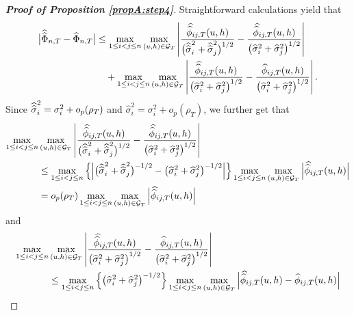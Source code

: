 \documentclass[12pt]{article}
\begin{document}
\begin{proof}[\textnormal{\textbf{Proof of Proposition \ref{propA:step4}}}] 
Straightforward calculations yield that
\begin{align*}
\begin{split}
\big| \doublehattwo{\Phi}_{n, T} - \widehat{\Phi}_{n, T} \big| &\le \max_{1 \le i < j \le n} \max_{(u,h) \in \mathcal{G}_T} \left|\frac{\doublehat{\phi}_{ij,T}(u,h)}{\big(\doublehattwo{\sigma}_i^2 + \doublehattwo{\sigma}_j^2\big)^{1/2}} - \frac{\doublehat{\phi}_{ij,T}(u,h)}{\big(\widehat{\sigma}_i^2 + \widehat{\sigma}_j^2\big)^{1/2}}\right| \\
&\quad+\max_{1 \le i < j \le n} \max_{(u,h) \in \mathcal{G}_T} \left|\frac{\doublehat{\phi}_{ij,T}(u,h)}{\big(\widehat{\sigma}_i^2 + \widehat{\sigma}_j^2\big)^{1/2}} - \frac{\widehat{\phi}_{ij,T}(u,h)} {\big( \widehat{\sigma}_i^2 + \widehat{\sigma}_j^2 \big)^{1/2}} \right|.
\end{split}
\end{align*}
Since $\widehat{\widehat{\sigma}}_i^2 = \sigma_i^2 + o_p(\rho_T)$ and $\widehat{\sigma}_i^2 = \sigma_i^2 + o_p(\rho_T)$, we further get that 
\begin{align*}
\max_{1 \le i < j \le n} &\max_{(u,h) \in \mathcal{G}_T} \left|\frac{\doublehat{\phi}_{ij,T}(u,h)}{\big(\doublehattwo{\sigma}_i^2 + \doublehattwo{\sigma}_j^2\big)^{1/2}} - \frac{\doublehat{\phi}_{ij,T}(u,h)}{\big(\widehat{\sigma}_i^2 + \widehat{\sigma}_j^2\big)^{1/2}}\right|  \\
&\le\max_{1 \le i < j \le n} \left\{ \Big|\big(\doublehattwo{\sigma}_i^2 + \doublehattwo{\sigma}_j^2 \big)^{-1/2} - \big(\widehat{\sigma}_i^2 + \widehat{\sigma}_j^2 \big)^{-1/2}\Big| \right\} \max_{1 \le i < j \le n} \max_{(u,h) \in \mathcal{G}_T} \Big|\doublehat{\phi}_{ij,T}(u,h)\Big| \\
& = o_p(\rho_T) \max_{1 \le i < j \le n} \max_{(u,h) \in \mathcal{G}_T} \Big|\doublehat{\phi}_{ij,T}(u,h)\Big|
\end{align*}
and 
\begin{align*}
\max_{1 \le i < j \le n} &\max_{(u,h) \in \mathcal{G}_T} \left|\frac{\doublehat{\phi}_{ij,T}(u,h)}{\big(\widehat{\sigma}_i^2 + \widehat{\sigma}_j^2\big)^{1/2}} - \frac{\widehat{\phi}_{ij,T}(u,h)} {\big( \widehat{\sigma}_i^2 + \widehat{\sigma}_j^2\big)^{1/2}} \right| \\
 & \le \max_{1\le i < j \le n} \left\{ \big(\widehat{\sigma}_i^2 + \widehat{\sigma}_j^2 \big)^{-1/2} \right\} \max_{1\le i < j \le n} \max_{(u,h) \in \mathcal{G}_T} \Big| \doublehat{\phi}_{ij, T}(u,h) - \widehat{\phi}_{ij, T}(u,h) \Big| \\

\end{align*}
\end{proof}
\end{document}
